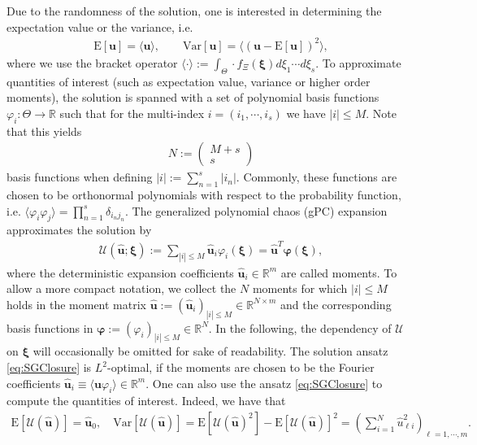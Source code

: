 Due to the randomness of the solution, one is interested in determining the expectation value or the variance, i.e.
\begin{align*}
\text{E}[\bm{u}] = \langle \bm{u} \rangle,\qquad \text{Var}[\bm{u}] = \langle \left( \bm{u}-\text{E}[\bm{u}]\right)^2\rangle,
\end{align*}
where we use the bracket operator $\langle \cdot \rangle := \int_{\Theta} \cdot f_{\Xi}(\bm\xi)d\xi_1 \cdots d\xi_s$. To approximate quantities of interest (such as expectation value, variance or higher order moments), the solution is spanned with a set of polynomial basis functions $\varphi_{i}:\Theta\to\mathbb{R}$ such that for the multi-index $i = (i_1,\cdots,i_s)$ we have $|i| \leq M$. Note that this yields
\begin{align}\label{eq:numberBasisFcts}
N:=\begin{pmatrix}
M+s \\ s
\end{pmatrix}
\end{align}
basis functions when defining $|i|:=\sum_{n = 1}^s |i_n|$. Commonly, these functions are chosen to be orthonormal polynomials \cite{wiener1938homogeneous} with respect to the probability function, i.e. $\langle \varphi_i \varphi_j \rangle =\prod_{n=1}^s\delta_{i_nj_n}$. The generalized polynomial chaos (gPC) expansion \cite{xiu2002wiener} approximates the solution by
\begin{align}\label{eq:SGClosure}
\mathcal{U}(\bm{\hat u};\bm\xi):= \sum_{|i|\leq M} \bm{\hat{u}}_i\varphi_i(\bm{\xi}) = \hat{\bm u}^T\bm{\varphi}(\bm\xi),
\end{align}
where the deterministic expansion coefficients $\bm{\hat{u}}_i\in\mathbb{R}^m$ are called moments. To allow a more compact notation, we collect the $N$ moments for which $\vert i \vert \leq M$ holds in the moment matrix $\hat{\bm u}:=(\bm{\hat{u}}_i)_{|i|\leq M}\in\mathbb{R}^{N\times m}$ and the corresponding basis functions in $\bm{\varphi}:=(\varphi_i)_{|i|\leq M}\in\mathbb{R}^{N}$. In the following, the dependency of $\mathcal{U}$ on $\bm \xi$ will occasionally be omitted for sake of readability. The solution ansatz \eqref{eq:SGClosure} is $L^2$-optimal, if the moments are chosen to be the Fourier coefficients $\bm{\hat u}_i \equiv \langle \bm{u}\varphi_i \rangle\in\mathbb{R}^m$. One can also use the ansatz \eqref{eq:SGClosure} to compute the quantities of interest. Indeed, we have that
\begin{align*}
\text{E}[\mathcal{U}(\bm{\hat u})] = \bm{\hat u}_0,\quad \text{Var}[\mathcal{U}(\bm{\hat u})] = \text{E}[\mathcal{U}(\bm{\hat u})^2] - \text{E}[\mathcal{U}(\bm{\hat u})]^2 = \left(\sum_{i = 1}^N \hat{u}_{\ell i}^2\right)_{\ell = 1,\cdots,m}.
\end{align*}

